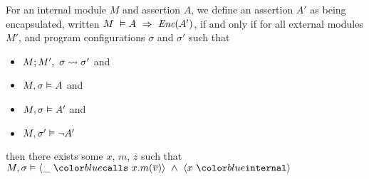 \begin{definition}
\label{def:encapsulation}
For an internal module $M$ and assertion $A$, we define an assertion $A'$ as being 
encapsulated, written $M\ \vDash A\ \Rightarrow\ \encaps{A'}$, if and only if
for all external modules $M'$, and program configurations $\sigma$ and $\sigma'$
such that 
\begin{itemize}
\item
$M ; M',\ \sigma \leadsto \sigma'$ and 
\item
$M , \sigma \vDash A$ and
\item
$M , \sigma \vDash A'$ and
\item
$M , \sigma' \vDash \neg A'$
\end{itemize}
then there exists some $x$, $m$, $\overline{z}$ such that
$\satisfiesA{M}{\sigma}{\calls{\_}{x}{m}{\overline{v}}\ \wedge\ \internal{x}}$
\end{definition}